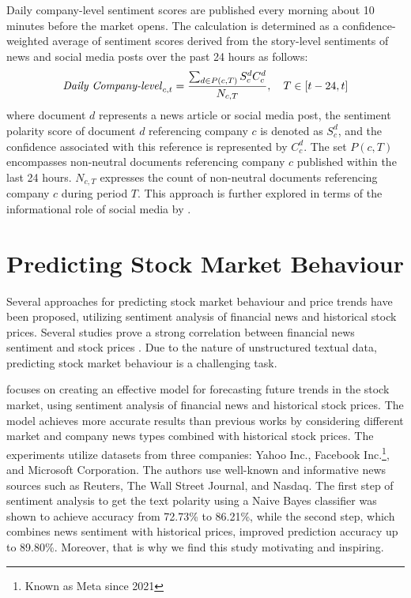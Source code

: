 Daily company-level sentiment scores are published every morning about 10 minutes before the market opens. The calculation is determined as a confidence-weighted average of sentiment scores derived from the story-level sentiments of news and social media posts over the past 24 hours as follows:
\begin{equation}
    \label{eq:daily-company-level-sentiment}
    \text{\textit{Daily Company-level}}_{c,t} = \frac{\sum_{d \in P(c,T)} S_{c}^{d} C_{c}^{d}}{N_{c,T}}, \quad T \in [t-24, t]
\end{equation} where document $d$ represents a news article or social media post, the sentiment polarity score of document $d$ referencing company $c$ is denoted as $S_{c}^{d}$, and the confidence associated with this reference is represented by $C_{c}^{d}$. The set $P(c,T)$ encompasses non-neutral documents referencing company $c$ published within the last 24 hours. $N_{c,T}$ expresses the count of non-neutral documents referencing company $c$ during period $T$. This approach is further explored in terms of the informational role of social media by \textcite{chenInformationalRole}.

\section{Predicting Stock Market Behaviour}
\label{sec:predicting-stock-market-behaviour}
Several approaches for predicting stock market behaviour and price trends have been proposed, utilizing sentiment analysis of financial news and historical stock prices. Several studies prove a strong correlation between financial news sentiment and stock prices \parencite{li2014newsimpact} \parencite{Wan2021}. Due to the nature of unstructured textual data, predicting stock market behaviour is a challenging task.

\textcite{khedr2017predicting} focuses on creating an effective model for forecasting future trends in the stock market, using sentiment analysis of financial news and historical stock prices. The model achieves more accurate results than previous works by considering different market and company news types combined with historical stock prices. The experiments utilize datasets from three companies: Yahoo Inc., Facebook Inc.\footnote{Known as Meta since 2021}, and Microsoft Corporation. The authors use well-known and informative news sources such as Reuters, The Wall Street Journal, and Nasdaq. The first step of sentiment analysis to get the text polarity using a Naive Bayes classifier was shown to achieve accuracy from 72.73\% to 86.21\%, while the second step, which combines news sentiment with historical prices, improved prediction accuracy up to 89.80\%. Moreover, that is why we find this study motivating and inspiring.

